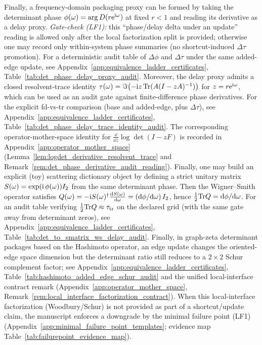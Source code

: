 \begin{remark}
\begin{enumerate}
Finally, a frequency-domain packaging proxy can be formed by taking the determinant phase $\phi(\omega)=\arg D(r\mathrm{e}^{\mathrm{i}\omega})$ at fixed $r<1$ and reading its derivative as a delay proxy.
\emph{Gate-check (LF1):} this ``phase/delay delta under an update'' reading is allowed only after the local factorization split is provided; otherwise one may record only within-system phase summaries (no shortcut-induced $\Delta\tau$ promotion).
For a deterministic audit table of $\Delta\phi$ and $\Delta\tau$ under the same added-edge update, see
Appendix~\ref{app:equivalence_ladder_certificates}, Table~\ref{tab:det_phase_delay_proxy_audit}.
Moreover, the delay proxy admits a closed resolvent-trace identity
$\tau(\omega)=\Im\bigl(-\mathrm{i} z\,\mathrm{Tr}(A(I-zA)^{-1})\bigr)$ for $z=r\mathrm{e}^{\mathrm{i}\omega}$, which can be used as an audit gate against finite-difference phase derivatives.
For the explicit fd-vs-tr comparison (base and added-edge, plus $\Delta\tau$), see
Appendix~\ref{app:equivalence_ladder_certificates}, Table~\ref{tab:det_phase_delay_trace_identity_audit}.
The corresponding operator-mother-space identity for $\frac{\dd}{\dd z}\log\det(I-zF)$ is recorded in Appendix~\ref{app:operator_mother_space}
(Lemma~\ref{lem:logdet_derivative_resolvent_trace} and Remark~\ref{rem:det_phase_derivative_audit_reading}).
Finally, one may build an explicit (toy) scattering dictionary object by defining a strict unitary matrix
$S(\omega)=\exp(\mathrm{i}\,\phi(\omega))I_2$ from the same determinant phase. Then the Wigner--Smith operator satisfies
$Q(\omega)=-\mathrm{i} S(\omega)^\dagger \frac{\mathrm{d} S(\omega)}{\mathrm{d}\omega}=(\mathrm{d}\phi/\mathrm{d}\omega)\,I_2$, hence $\tfrac12\mathrm{Tr} Q=\mathrm{d}\phi/\mathrm{d}\omega$.
For an audit table verifying $\tfrac12\mathrm{Tr} Q \approx \tau_{\mathrm{tr}}$ on the declared grid (with the same gate away from determinant zeros), see
Appendix~\ref{app:equivalence_ladder_certificates}, Table~\ref{tab:det_to_smatrix_ws_delay_audit}.
Finally, in graph-zeta determinant packages based on the Hashimoto operator, an edge update changes the oriented-edge space dimension but the determinant ratio still reduces to a $2\times2$ Schur complement factor;
see Appendix~\ref{app:equivalence_ladder_certificates}, Table~\ref{tab:hashimoto_added_edge_schur_audit} and the unified local-interface contract remark
(Appendix~\ref{app:operator_mother_space}, Remark~\ref{rem:local_interface_factorization_contract}).
When this local-interface factorization (Woodbury/Schur) is not provided as part of a shortcut/update claim, the manuscript enforces a downgrade by the minimal failure point (LF1)
(Appendix~\ref{app:minimal_failure_point_templates}; evidence map Table~\ref{tab:failurepoint_evidence_map}).
\end{enumerate}
\end{remark}

